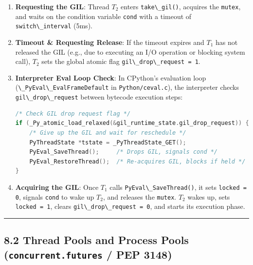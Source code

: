 \begin{enumerate}
\def\labelenumi{\arabic{enumi}.}
\item
  \textbf{Requesting the GIL}: Thread \(T_2\) enters
  \passthrough{\lstinline!take\_gil()!}, acquires the
  \passthrough{\lstinline!mutex!}, and waits on the condition variable
  \passthrough{\lstinline!cond!} with a timeout of
  \passthrough{\lstinline!switch\_interval!} (5ms).
\item
  \textbf{Timeout \& Requesting Release}: If the timeout expires and
  \(T_1\) has not released the GIL (e.g., due to executing an I/O
  operation or blocking system call), \(T_2\) sets the global atomic
  flag \passthrough{\lstinline!gil\_drop\_request = 1!}.
\item
  \textbf{Interpreter Eval Loop Check}: In CPython's evaluation loop
  (\passthrough{\lstinline!\_PyEval\_EvalFrameDefault!} in
  \passthrough{\lstinline!Python/ceval.c!}), the interpreter checks
  \passthrough{\lstinline!gil\_drop\_request!} between bytecode
  execution steps:

\begin{lstlisting}[language=C]
/* Check GIL drop request flag */
if (_Py_atomic_load_relaxed(&gil_runtime_state.gil_drop_request)) {
    /* Give up the GIL and wait for reschedule */
    PyThreadState *tstate = _PyThreadState_GET();
    PyEval_SaveThread();     /* Drops GIL, signals cond */
    PyEval_RestoreThread();  /* Re-acquires GIL, blocks if held */
}
\end{lstlisting}
\item
  \textbf{Acquiring the GIL}: Once \(T_1\) calls
  \passthrough{\lstinline!PyEval\_SaveThread()!}, it sets
  \passthrough{\lstinline!locked = 0!}, signals
  \passthrough{\lstinline!cond!} to wake up \(T_2\), and releases the
  \passthrough{\lstinline!mutex!}. \(T_2\) wakes up, sets
  \passthrough{\lstinline!locked = 1!}, clears
  \passthrough{\lstinline!gil\_drop\_request = 0!}, and starts its
  execution phase.
\end{enumerate}

\begin{center}\rule{0.5\linewidth}{0.5pt}\end{center}

\hypertarget{thread-pools-and-process-pools-concurrent.futures-pep-3148}{%
\subsection{\texorpdfstring{8.2 Thread Pools and Process Pools
(\texttt{concurrent.futures} / PEP
3148)}{8.2 Thread Pools and Process Pools (concurrent.futures / PEP 3148)}}\label{thread-pools-and-process-pools-concurrent.futures-pep-3148}}

